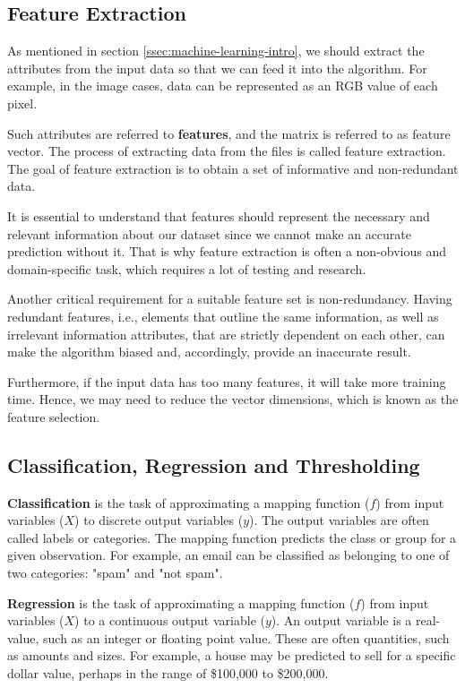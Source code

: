 \subsection{Feature Extraction}

As mentioned in section \ref{ssec:machine-learning-intro}, we should extract the attributes from the input data so that we can feed it into the algorithm. For example, in the image cases, data can be represented as an RGB value of each pixel.

Such attributes are referred to \textbf{features}, and the matrix is referred to as feature vector. The process of extracting data from the files is called feature extraction. The goal of feature extraction is to obtain a set of informative and non-redundant data. 

It is essential to understand that features should represent the necessary and relevant information about our dataset since we cannot make an accurate prediction without it. That is why feature extraction is often a non-obvious and domain-specific task, which requires a lot of testing and research.

Another critical requirement for a suitable feature set is non-redundancy. Having redundant features, i.e., elements that outline the same information, as well as irrelevant information attributes, that are strictly dependent on each other, can make the algorithm biased and, accordingly, provide an inaccurate result.

Furthermore, if the input data has too many features, it will take more training time. Hence, we may need to reduce the vector dimensions, which is known as the feature selection.

\subsection{Classification, Regression and Thresholding}

\textbf{Classification} is the task of approximating a mapping function ($f$) from input variables ($X$) to discrete output variables ($y$). The output variables are often called labels or categories. The mapping function predicts the class or group for a given observation. For example, an email can be classified as belonging to one of two categories: "spam" and "not spam".

\textbf{Regression} is the task of approximating a mapping function ($f$) from input variables ($X$) to a continuous output variable ($y$). An output variable is a real-value, such as an integer or floating point value. These are often quantities, such as amounts and sizes. For example, a house may be predicted to sell for a specific dollar value, perhaps in the range of \$100,000 to \$200,000.

